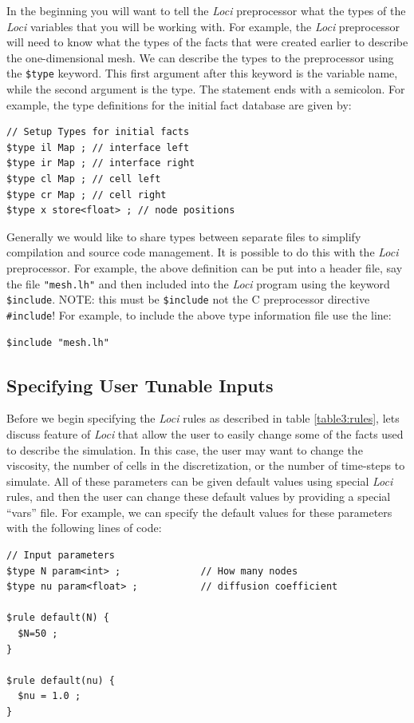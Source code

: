 \documentclass[10pt,epsf,letterpaper,twoside]{book}
\begin{document}
In the beginning you will want to tell the {\it Loci} preprocessor
what the types of the {\it Loci} variables that you will be working
with.  For example, the {\it Loci} preprocessor will need to know what
the types of the facts that were created earlier to describe the
one-dimensional mesh.  We can describe the types to the preprocessor
using the {\tt \$type} keyword.  This first argument after this
keyword is the variable name, while the second argument is the type.
The statement ends with a semicolon.  For example, the type
definitions for the initial fact database are given by:
\begin{verbatim}
// Setup Types for initial facts
$type il Map ; // interface left
$type ir Map ; // interface right
$type cl Map ; // cell left
$type cr Map ; // cell right
$type x store<float> ; // node positions
\end{verbatim}

Generally we would like to share types between separate files to
simplify compilation and source code management.  It is possible to do
this with the {\it Loci} preprocessor.  For example, the above definition
can be put into a header file, say the file {\tt "mesh.lh"} and then
included into the {\it Loci} program using the keyword {\tt \$include}.
NOTE: this must be {\tt \$include} not the C preprocessor directive
{\tt \#include}!  For example, to include the above type information
file use the line:
\begin{verbatim}
$include "mesh.lh"
\end{verbatim}

\subsection{Specifying User Tunable Inputs}
Before we begin specifying the {\it Loci} rules as described in table
\ref{table3:rules}, lets discuss feature of {\it Loci} that allow the user
to easily change some of the facts used to describe the simulation.
In this case, the user may want to change the viscosity, the number of
cells in the discretization, or the number of time-steps to simulate.
All of these parameters can be given default values using special {\it Loci}
rules, and then the user can change these default values by providing
a special ``vars'' file.  For example, we can specify the default
values for these parameters with the following lines of code:
\newpage
\begin{verbatim}
// Input parameters
$type N param<int> ;              // How many nodes
$type nu param<float> ;           // diffusion coefficient

$rule default(N) {
  $N=50 ;
}

$rule default(nu) {
  $nu = 1.0 ;
}
\end{verbatim}
\end{document}
